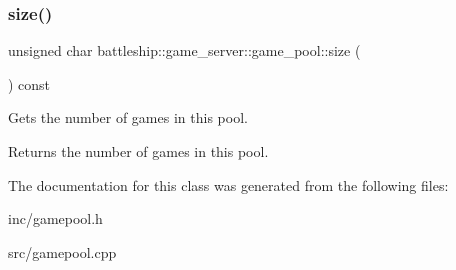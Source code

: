 \subsubsection{\texorpdfstring{size()}{size()}}
{\footnotesize\ttfamily unsigned char battleship\+::game\+\_\+server\+::game\+\_\+pool\+::size (\begin{DoxyParamCaption}{ }\end{DoxyParamCaption}) const\hspace{0.3cm}{\ttfamily [inline]}}

Gets the number of games in this pool. \begin{DoxyReturn}{Returns}
the number of games in this pool. 
\end{DoxyReturn}


The documentation for this class was generated from the following files\+:\begin{DoxyCompactItemize}
\item 
inc/gamepool.\+h\item 
src/gamepool.\+cpp\end{DoxyCompactItemize}
